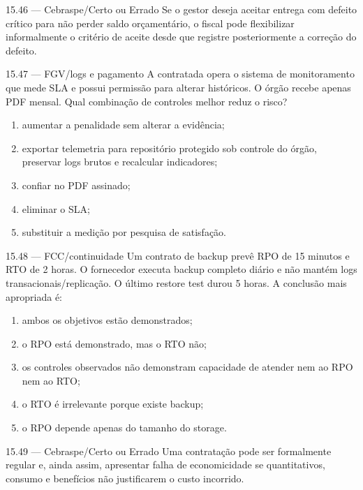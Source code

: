 \begin{questao}{ 15.46 — Cebraspe/Certo ou Errado}
Se o gestor deseja aceitar entrega com defeito crítico para não perder saldo orçamentário, o fiscal pode flexibilizar informalmente o critério de aceite desde que registre posteriormente a correção do defeito.
\end{questao}

\begin{questao}{ 15.47 — FGV/logs e pagamento}
A contratada opera o sistema de monitoramento que mede SLA e possui permissão para alterar históricos. O órgão recebe apenas PDF mensal. Qual combinação de controles melhor reduz o risco?
\begin{enumerate}[label=\Alph*)]
\item aumentar a penalidade sem alterar a evidência;
\item exportar telemetria para repositório protegido sob controle do órgão, preservar logs brutos e recalcular indicadores;
\item confiar no PDF assinado;
\item eliminar o SLA;
\item substituir a medição por pesquisa de satisfação.
\end{enumerate}
\end{questao}

\begin{questao}{ 15.48 — FCC/continuidade}
Um contrato de backup prevê RPO de 15 minutos e RTO de 2 horas. O fornecedor executa backup completo diário e não mantém logs transacionais/replicação. O último restore test durou 5 horas. A conclusão mais apropriada é:
\begin{enumerate}[label=\Alph*)]
\item ambos os objetivos estão demonstrados;
\item o RPO está demonstrado, mas o RTO não;
\item os controles observados não demonstram capacidade de atender nem ao RPO nem ao RTO;
\item o RTO é irrelevante porque existe backup;
\item o RPO depende apenas do tamanho do storage.
\end{enumerate}
\end{questao}

\begin{questao}{ 15.49 — Cebraspe/Certo ou Errado}
Uma contratação pode ser formalmente regular e, ainda assim, apresentar falha de economicidade se quantitativos, consumo e benefícios não justificarem o custo incorrido.
\end{questao}

